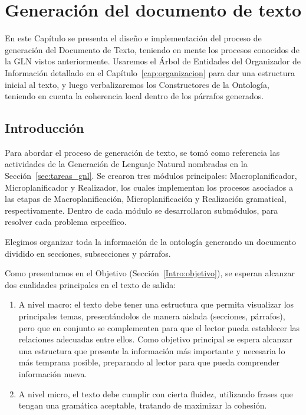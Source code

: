 \chapter{Generación del documento de texto}

En este Capítulo se presenta el diseño e implementación del proceso de generación del Documento de Texto, teniendo en mente los procesos conocidos de la GLN vistos anteriormente. Usaremos el Árbol de Entidades del Organizador de Información detallado en el Capítulo~\ref{cap:organizacion} para dar una estructura inicial al texto, y luego verbalizaremos los Constructores de la Ontología, teniendo en cuenta la coherencia local dentro de los párrafos generados.

\section{Introducción}
Para abordar el proceso de generación de texto, se tomó como referencia las actividades de la Generación de Lenguaje Natural nombradas en la Sección~\ref{sec:tareas_gnl}. Se crearon tres módulos principales: Macroplanificador, Microplanificador y Realizador, los cuales implementan los procesos asociados a las etapas de Macroplanificación, Microplanificación y Realización gramatical, respectivamente. Dentro de cada módulo se desarrollaron submódulos, para resolver cada problema específico. 

Elegimos organizar toda la información de la ontología generando un documento dividido en secciones, subsecciones y párrafos. 

Como presentamos en el Objetivo (Sección~\ref{Intro:objetivo}), se esperan alcanzar dos cualidades principales en el texto de salida:
\begin{enumerate}
    \item A nivel macro: el texto debe tener una estructura que permita visualizar los principales temas, presentándolos de manera aislada (secciones, párrafos), pero que en conjunto se complementen para que el lector pueda establecer las relaciones adecuadas entre ellos. Como objetivo principal se espera alcanzar una estructura que presente la información más importante y necesaria lo más temprana posible, preparando al lector para que pueda comprender información nueva.
    \item A nivel micro, el texto debe cumplir con cierta fluidez, utilizando frases que tengan una gramática aceptable, tratando de maximizar la cohesión.
\end{enumerate}

